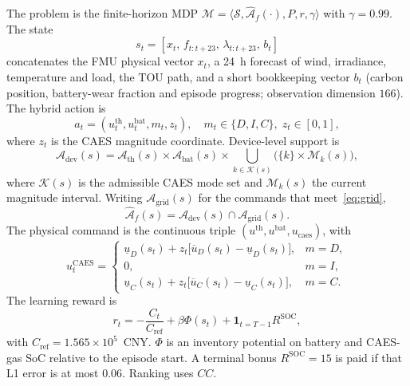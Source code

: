 \documentclass[conference]{IEEEtran}
\newcommand{\Afhat}{\widehat{\mathcal{A}}_{f}}
\begin{document}
The problem is the finite-horizon MDP \(\mathcal{M}=\langle\mathcal{S},\Afhat(\cdot),P,r,\gamma\rangle\) with \(\gamma=0.99\). The state
\begin{equation}
s_t=[x_t,\,f_{t:t+23},\,\lambda_{t:t+23},\,b_t]
\label{eq:state}
\end{equation}
concatenates the FMU physical vector \(x_t\), a 24~h forecast of wind, irradiance, temperature and load, the TOU path, and a short bookkeeping vector \(b_t\) (carbon position, battery-wear fraction and episode progress; observation dimension \(166\)). The hybrid action is
\begin{equation}
a_t=(u_t^{\mathrm{th}},u_t^{\mathrm{bat}},m_t,z_t),
\quad m_t\in\{D,I,C\},\; z_t\in[0,1],
\label{eq:action-hyb}
\end{equation}
where \(z_t\) is the CAES magnitude coordinate.
Device-level support is
\begin{equation}
\mathcal{A}_{\mathrm{dev}}(s)
=
\mathcal{A}_{\mathrm{th}}(s)\times
\mathcal{A}_{\mathrm{bat}}(s)\times
\bigcup_{k\in\mathcal{K}(s)}
\bigl(\{k\}\times\mathcal{M}_k(s)\bigr),
\label{eq:adev}
\end{equation}
where \(\mathcal{K}(s)\) is the admissible CAES mode set and \(\mathcal{M}_k(s)\) the current magnitude interval. Writing \(\mathcal{A}_{\mathrm{grid}}(s)\) for the commands that meet~\eqref{eq:grid},
\begin{equation}
\Afhat(s)
=
\mathcal{A}_{\mathrm{dev}}(s)\cap\mathcal{A}_{\mathrm{grid}}(s).
\label{eq:support}
\end{equation}
The physical command is the continuous triple \((u^{\mathrm{th}},u^{\mathrm{bat}},u_{\mathrm{caes}})\), with
\begin{equation}
u_t^{\mathrm{CAES}}
=
\begin{cases}
\underline{u}_D(s_t)+z_t\bigl[\overline{u}_D(s_t)-\underline{u}_D(s_t)\bigr], & m=D,\\
0, & m=I,\\
\underline{u}_C(s_t)+z_t\bigl[\overline{u}_C(s_t)-\underline{u}_C(s_t)\bigr], & m=C.
\end{cases}
\label{eq:decode}
\end{equation}
The learning reward is
\begin{equation}
r_t
=
-\frac{C_t}{C_{\mathrm{ref}}}
+\beta\Phi(s_t)
+\mathbf{1}_{t=T-1}R^{\mathrm{SOC}},
\label{eq:reward}
\end{equation}
with \(C_{\mathrm{ref}}=1.565\times10^{5}\)~CNY. \(\Phi\) is an inventory potential on battery and CAES-gas SoC relative to the episode start. A terminal bonus \(R^{\mathrm{SOC}}=15\) is paid if that L1 error is at most \(0.06\). Ranking uses \(CC\).
\end{document}
